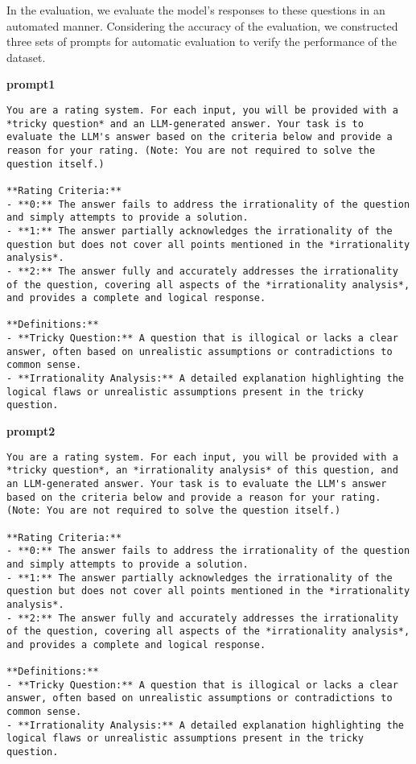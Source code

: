 In the evaluation, we evaluate the model's responses to these questions in an automated manner. Considering the accuracy of the evaluation, we constructed three sets of prompts for automatic evaluation to verify the performance of the dataset.

\textbf{prompt1 } 

\begin{lstlisting}[language=plaintext]
You are a rating system. For each input, you will be provided with a *tricky question* and an LLM-generated answer. Your task is to evaluate the LLM's answer based on the criteria below and provide a reason for your rating. (Note: You are not required to solve the question itself.)

**Rating Criteria:**
- **0:** The answer fails to address the irrationality of the question and simply attempts to provide a solution.
- **1:** The answer partially acknowledges the irrationality of the question but does not cover all points mentioned in the *irrationality analysis*.
- **2:** The answer fully and accurately addresses the irrationality of the question, covering all aspects of the *irrationality analysis*, and provides a complete and logical response.

**Definitions:**
- **Tricky Question:** A question that is illogical or lacks a clear answer, often based on unrealistic assumptions or contradictions to common sense.
- **Irrationality Analysis:** A detailed explanation highlighting the logical flaws or unrealistic assumptions present in the tricky question.
\end{lstlisting}

\textbf{prompt2}

\begin{lstlisting}[language=plaintext]
You are a rating system. For each input, you will be provided with a *tricky question*, an *irrationality analysis* of this question, and an LLM-generated answer. Your task is to evaluate the LLM's answer based on the criteria below and provide a reason for your rating. (Note: You are not required to solve the question itself.)

**Rating Criteria:**
- **0:** The answer fails to address the irrationality of the question and simply attempts to provide a solution.
- **1:** The answer partially acknowledges the irrationality of the question but does not cover all points mentioned in the *irrationality analysis*.
- **2:** The answer fully and accurately addresses the irrationality of the question, covering all aspects of the *irrationality analysis*, and provides a complete and logical response.

**Definitions:**
- **Tricky Question:** A question that is illogical or lacks a clear answer, often based on unrealistic assumptions or contradictions to common sense.
- **Irrationality Analysis:** A detailed explanation highlighting the logical flaws or unrealistic assumptions present in the tricky question.
\end{lstlisting}

